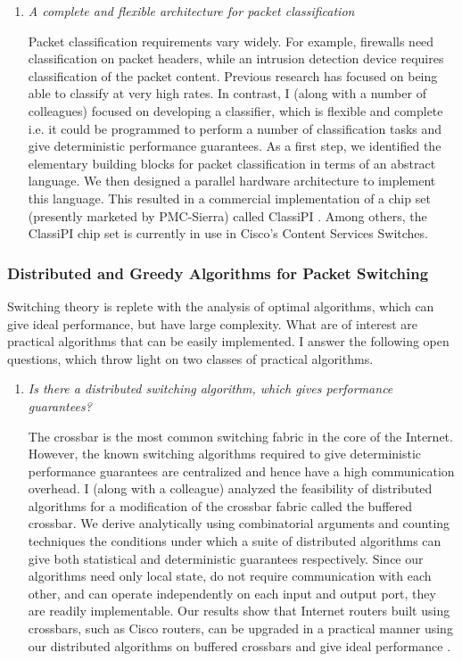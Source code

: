 \documentclass[a4paper, 10pt]{article}
\begin{document}
\begin{small}
\begin{enumerate}
\item {\em A complete and flexible architecture for packet classification}

Packet classification requirements vary widely.
For example, firewalls need classification on packet headers, while an
intrusion detection device requires classification of the packet content. 
Previous research has focused on being able to classify at very
high rates. In contrast, I (along with a number of colleagues) 
focused on developing a classifier, which is flexible and complete i.e. it could be programmed to
perform a number of classification tasks and give deterministic performance guarantees.
As a first step, we identified the elementary building blocks for packet
classification in terms of an abstract language. We then designed a parallel hardware architecture
to implement this 
language. This resulted in a commercial implementation of a chip set
(presently marketed by PMC-Sierra) called ClassiPI \cite{classipi}.
Among others, the ClassiPI chip set is currently in use in Cisco's
Content Services Switches.


\end{enumerate}

\subsubsection*{\small Distributed and Greedy Algorithms for Packet Switching}

Switching theory is replete with the analysis of optimal algorithms, which can give 
ideal performance, but have large complexity. What are of interest are practical algorithms that can 
be easily implemented. I answer the following open questions, which throw light on two classes of 
practical algorithms.

\begin{enumerate}
\item {\em Is there a distributed switching algorithm, which gives performance guarantees?}

The crossbar is the most common switching fabric in the core of the Internet. However,
the known switching algorithms required to give deterministic performance 
guarantees are centralized and hence have a high communication overhead.
I (along with a colleague) analyzed the feasibility of distributed algorithms for a
modification of the crossbar fabric called the buffered crossbar.
We derive analytically using combinatorial arguments and counting techniques the
conditions under which a suite of distributed algorithms can give 
both statistical and deterministic
guarantees respectively. 
Since our algorithms need only local state, do not require communication with each other, 
and can operate independently on each input and output port, they are readily implementable.
Our results show that Internet routers built using crossbars, such as Cisco routers, can 
be upgraded in a practical manner using our distributed 
algorithms on buffered crossbars and give ideal performance \cite{buffxbar}.


\end{enumerate}
\end{small}
\end{document}
